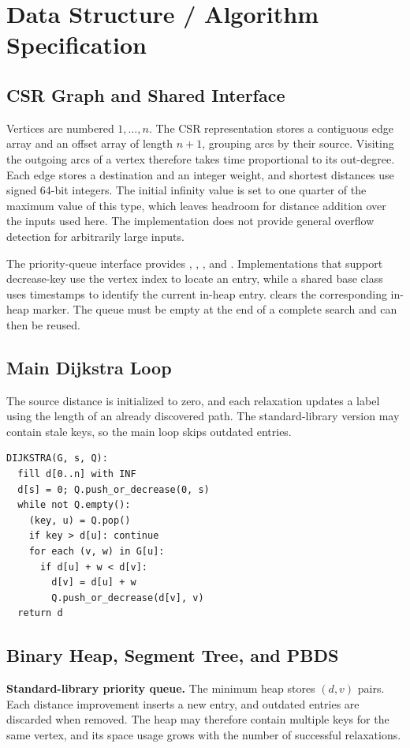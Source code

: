 \section{Data Structure / Algorithm Specification}
\label{sec:algorithms}
\subsection{CSR Graph and Shared Interface}
Vertices are numbered $1,\ldots,n$. The CSR representation stores a contiguous
edge array and an offset array of length $n+1$, grouping arcs by their source.
Visiting the outgoing arcs of a vertex therefore takes time proportional to its
out-degree. Each edge stores a destination and an integer weight, and shortest
distances use signed 64-bit integers. The initial infinity value is set to one
quarter of the maximum value of this type, which leaves headroom for distance
addition over the inputs used here. The implementation does not provide general
overflow detection for arbitrarily large inputs.

The priority-queue interface provides , ,
, and . Implementations that support decrease-key use
the vertex index to locate an entry, while a shared base class uses timestamps to
identify the current in-heap entry.  clears the corresponding in-heap
marker. The queue must be empty at the end of a complete search and can then be reused.

\subsection{Main Dijkstra Loop}
The source distance is initialized to zero, and each relaxation updates a label
using the length of an already discovered path. The standard-library version may
contain stale keys, so the main loop skips outdated entries.

\begin{lstlisting}[caption={Shared Dijkstra pseudocode}]
DIJKSTRA(G, s, Q):
  fill d[0..n] with INF
  d[s] = 0; Q.push_or_decrease(0, s)
  while not Q.empty():
    (key, u) = Q.pop()
    if key > d[u]: continue
    for each (v, w) in G[u]:
      if d[u] + w < d[v]:
        d[v] = d[u] + w
        Q.push_or_decrease(d[v], v)
  return d
\end{lstlisting}

\subsection{Binary Heap, Segment Tree, and PBDS}
\textbf{Standard-library priority queue.} The minimum heap stores $(d,v)$ pairs.
Each distance improvement inserts a new entry, and outdated entries are discarded
when removed. The heap may therefore contain multiple keys for the same vertex,
and its space usage grows with the number of successful relaxations.

